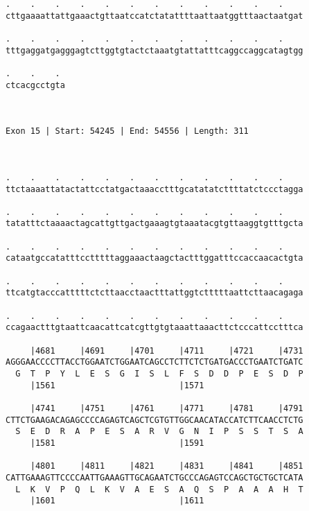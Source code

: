 \documentclass{article}
\begin{document}
\begin{Verbatim}
.    .    .    .    .    .    .    .    .    .    .    .    
cttgaaaattattgaaactgttaatccatctatattttaattaatggtttaactaatgat
                                                            
.    .    .    .    .    .    .    .    .    .    .    .    
tttgaggatgagggagtcttggtgtactctaaatgtattatttcaggccaggcatagtgg
                                                            
.    .    . 
ctcacgcctgta
            
            
 
Exon 15 | Start: 54245 | End: 54556 | Length: 311



.    .    .    .    .    .    .    .    .    .    .    .    
ttctaaaattatactattcctatgactaaacctttgcatatatcttttatctccctagga
                                                            
.    .    .    .    .    .    .    .    .    .    .    .    
tatatttctaaaactagcattgttgactgaaagtgtaaatacgtgttaaggtgtttgcta
                                                            
.    .    .    .    .    .    .    .    .    .    .    .    
cataatgccatatttcctttttaggaaactaagctactttggatttccaccaacactgta
                                                            
.    .    .    .    .    .    .    .    .    .    .    .    
ttcatgtacccatttttctcttaacctaactttattggtctttttaattcttaacagaga
                                                            
.    .    .    .    .    .    .    .    .    .    .    .    
ccagaactttgtaattcaacattcatcgttgtgtaaattaaacttctcccattcctttca
                                                            
     |4681     |4691     |4701     |4711     |4721     |4731
AGGGAACCCCTTACCTGGAATCTGGAATCAGCCTCTTCTCTGATGACCCTGAATCTGATC
  G  T  P  Y  L  E  S  G  I  S  L  F  S  D  D  P  E  S  D  P
     |1561                         |1571                    
  
     |4741     |4751     |4761     |4771     |4781     |4791
CTTCTGAAGACAGAGCCCCAGAGTCAGCTCGTGTTGGCAACATACCATCTTCAACCTCTG
  S  E  D  R  A  P  E  S  A  R  V  G  N  I  P  S  S  T  S  A
     |1581                         |1591                    
  
     |4801     |4811     |4821     |4831     |4841     |4851
CATTGAAAGTTCCCCAATTGAAAGTTGCAGAATCTGCCCAGAGTCCAGCTGCTGCTCATA
  L  K  V  P  Q  L  K  V  A  E  S  A  Q  S  P  A  A  A  H  T
     |1601                         |1611                    
  

\end{Verbatim}
\end{document}
